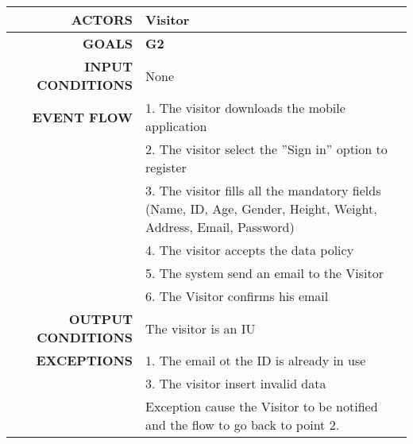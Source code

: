\begin{table}[h!]
\begin{tabular}{|r|p{3in}|}
\hline
\textbf{ACTORS} & Visitor\\
\hline
\textbf{GOALS} & \textbf{G2} \\
\hline
\textbf{INPUT CONDITIONS} & None \\
\hline
\textbf{EVENT FLOW} 
&1. The visitor downloads the mobile application \\
&2. The visitor select the ''Sign in'' option to register \\
&3. The visitor fills all the mandatory fields (Name, ID, Age, Gender, Height, Weight, Address, Email, Password) \\
&4. The visitor accepts the data policy \\
&5. The system send an email to the Visitor \\
&6. The Visitor confirms his email \\
\hline
\textbf{OUTPUT CONDITIONS} & The visitor is an IU \\
\hline
\textbf{EXCEPTIONS}
&1. The email ot the ID is already in use \\
&3. The visitor insert invalid data \\
&Exception cause the Visitor to be notified and the flow to go back to point 2.\\
\hline
\end{tabular}
\end{table}